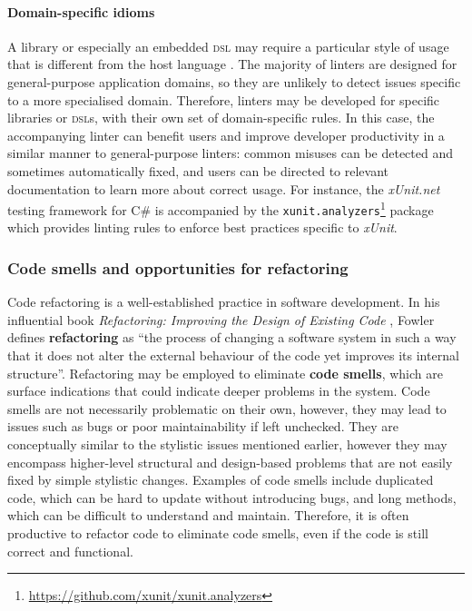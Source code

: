\paragraph{Domain-specific idioms}
A library or especially an embedded \textsc{dsl} may require a particular style of usage that is different from the host language \cite{hora_domain_2012}.
The majority of linters are designed for general-purpose application domains, so they are unlikely to detect issues specific to a more specialised domain.
Therefore, linters may be developed for specific libraries or \textsc{dsl}s, with their own set of domain-specific rules.
In this case, the accompanying linter can benefit users and improve developer productivity in a similar manner to general-purpose linters: common misuses can be detected and sometimes automatically fixed, and users can be directed to relevant documentation to learn more about correct usage.
For instance, the \emph{xUnit.net} testing framework for C\# is accompanied by the \texttt{xunit.analyzers}\footnote{\url{https://github.com/xunit/xunit.analyzers}} package which provides linting rules to enforce best practices specific to \emph{xUnit}.

\subsubsection{Code smells and opportunities for refactoring}

Code refactoring is a well-established practice in software development.
In his influential book \emph{Refactoring: Improving the Design of Existing Code} \cite{fowler_refactoring_2018}, Fowler defines \textbf{refactoring} as ``the process of changing a software system in such a way that it does not alter the external behaviour of the code yet improves its internal structure''.
Refactoring may be employed to eliminate \textbf{code smells}, which are surface indications that could indicate deeper problems in the system.
Code smells are not necessarily problematic on their own, however, they may lead to issues such as bugs or poor maintainability if left unchecked.
They are conceptually similar to the stylistic issues mentioned earlier, however they may encompass higher-level structural and design-based problems that are not easily fixed by simple stylistic changes.
Examples of code smells include duplicated code, which can be hard to update without introducing bugs, and long methods, which can be difficult to understand and maintain.
Therefore, it is often productive to refactor code to eliminate code smells, even if the code is still correct and functional.

